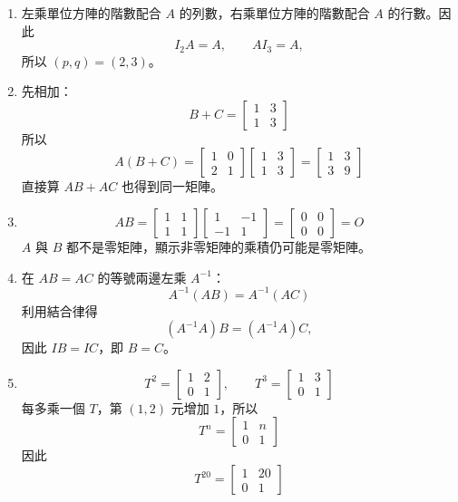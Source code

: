 \documentclass[11pt,a4paper]{article}
\begin{document}
\begin{enumerate}
\def\labelenumi{\arabic{enumi}.}
\item
  左乘單位方陣的階數配合 \(A\) 的列數，右乘單位方陣的階數配合 \(A\) 的行數。因此
  \[I_2A=A,\qquad AI_3=A,\]
  所以 \((p,q)=(2,3)\)。
\item
  先相加：
  \[B+C=\begin{bmatrix}1&3\\1&3\end{bmatrix}\]
  所以
  \[
  A(B+C)
  =\begin{bmatrix}1&0\\2&1\end{bmatrix}
  \begin{bmatrix}1&3\\1&3\end{bmatrix}
  =\begin{bmatrix}1&3\\3&9\end{bmatrix}
  \]
  直接算 \(AB+AC\) 也得到同一矩陣。
\item
  \[
   AB=\begin{bmatrix}1&1\\1&1\end{bmatrix}
   \begin{bmatrix}1&-1\\-1&1\end{bmatrix}
   =\begin{bmatrix}0&0\\0&0\end{bmatrix}=O
   \]
  \(A\) 與 \(B\) 都不是零矩陣，顯示非零矩陣的乘積仍可能是零矩陣。
\item
  在 \(AB=AC\) 的等號兩邊左乘 \(A^{-1}\)：
  \[A^{-1}(AB)=A^{-1}(AC)\]
  利用結合律得
  \[(A^{-1}A)B=(A^{-1}A)C,\]
  因此 \(IB=IC\)，即 \(B=C\)。
\item
  \[
   T^2=\begin{bmatrix}1&2\\0&1\end{bmatrix},
   \qquad
   T^3=\begin{bmatrix}1&3\\0&1\end{bmatrix}
   \]
  每多乘一個 \(T\)，第 \((1,2)\) 元增加 \(1\)，所以
  \[T^n=\begin{bmatrix}1&n\\0&1\end{bmatrix}\]
  因此
  \[T^{20}=\begin{bmatrix}1&20\\0&1\end{bmatrix}\]
\end{enumerate}
\end{document}
